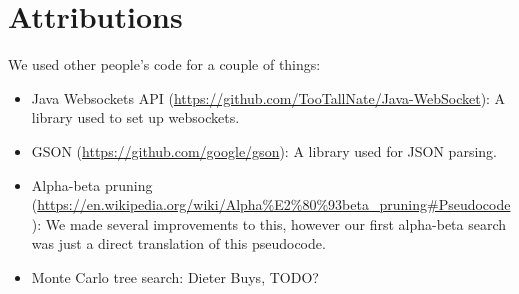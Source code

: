 \section{Attributions}

We used other people's code for a couple of things:

\begin{itemize}
\item Java Websockets API (\url{https://github.com/TooTallNate/Java-WebSocket}): A library used to set up websockets.
\item GSON (\url{https://github.com/google/gson}): A library used for JSON parsing.
\item Alpha-beta pruning (\url{https://en.wikipedia.org/wiki/Alpha%E2%80%93beta_pruning#Pseudocode}): We made several improvements to this, however our first alpha-beta search was just a direct translation of this pseudocode.
\item Monte Carlo tree search: Dieter Buys, TODO?
\end{itemize}